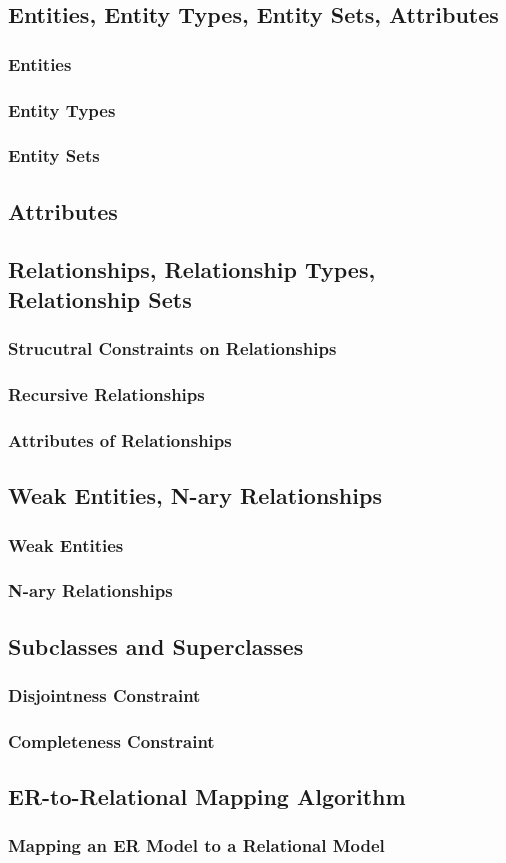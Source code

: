 \subsection{Entities, Entity Types, Entity Sets, Attributes}
\subsubsection{Entities} 
\subsubsection{Entity Types}
\subsubsection{Entity Sets}
\subsection{Attributes}

\subsection{Relationships, Relationship Types, Relationship Sets}
\subsubsection{Strucutral Constraints on Relationships}
\subsubsection{Recursive Relationships}
\subsubsection{Attributes of Relationships}

\subsection{Weak Entities, N-ary Relationships}
\subsubsection{Weak Entities}
\subsubsection{N-ary Relationships}

\subsection{Subclasses and Superclasses}
\subsubsection{Disjointness Constraint}
\subsubsection{Completeness Constraint}

\subsection{ER-to-Relational Mapping Algorithm}
\subsubsection{Mapping an ER Model to a Relational Model}
